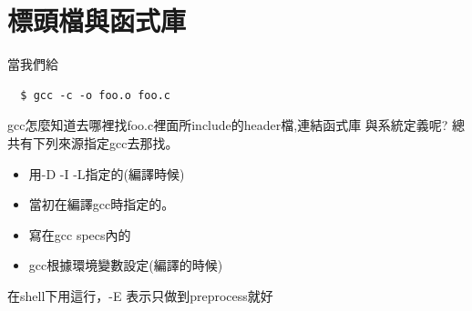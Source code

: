   \section{標頭檔與函式庫}
  當我們給
  \begin{verbatim}
  $ gcc -c -o foo.o foo.c
  \end{verbatim}
  gcc怎麼知道去哪裡找foo.c裡面所include的header檔,連結函式庫
  與系統定義呢? 總共有下列來源指定gcc去那找。
  \begin{itemize}
    \item 用-D -I -L指定的(編譯時候)
    \item 當初在編譯gcc時指定的。
    \item 寫在gcc specs內的
    \item gcc根據環境變數設定(編譯的時候)
  \end{itemize}
  在shell下用這行，-E 表示只做到preprocess就好

